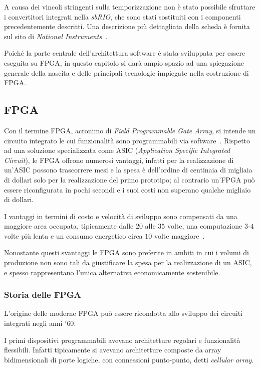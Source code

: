 A causa dei vincoli stringenti sulla temporizzazione non è stato possibile sfruttare i convertitori integrati nella \textit{sbRIO}, che sono stati sostituiti con i componenti precedentemente descritti. Una descrizione più dettagliata della scheda è fornita sul sito di \textit{National Instruments}~\cite{sitesbrio}.

Poiché la parte centrale dell'architettura software è stata sviluppata per essere eseguita su FPGA, in questo capitolo si darà ampio spazio ad una spiegazione generale della nascita e delle principali tecnologie impiegate nella costruzione di FPGA.

\subsection{FPGA}
Con il termine FPGA, acronimo di \textit{Field Programmable Gate Array}, si intende un circuito integrato le cui funzionalità sono programmabili via software~\cite{Kuon:2008:FAS:1454695.1454696}. Rispetto ad una soluzione specializzata come ASIC (\textit{Application Specific Integrated Circuit}), le FPGA offrono numerosi vantaggi, infatti per la realizzazione di un'ASIC possono trascorrere mesi e la spesa è dell'ordine di centinaia di migliaia di dollari solo per la realizzazione del primo prototipo; al contrario un'FPGA può essere riconfigurata in pochi secondi e i suoi costi non superano qualche migliaio di dollari.

I vantaggi in termini di costo e velocità di sviluppo sono compensati da una maggiore area occupata, tipicamente dalle $20$ alle $35$ volte, una computazione $3$-$4$ volte più lenta e un consumo energetico circa $10$ volte maggiore~\cite{4068926}.

Nonostante questi svantaggi le FPGA sono preferite in ambiti in cui i volumi di produzione non sono tali da giustificare la spesa per la realizzazione di un ASIC, e spesso rappresentano l'unica alternativa economicamente sostenibile.

\subsubsection{Storia delle FPGA}
L'origine delle moderne FPGA può essere ricondotta allo sviluppo dei circuiti integrati negli anni $'60$. 

I primi dispositivi programmabili avevano architetture regolari e funzionalità flessibili. Infatti tipicamente si avevano architetture composte da array bidimensionali di porte logiche, con connessioni punto-punto, detti \textit{cellular array}.

